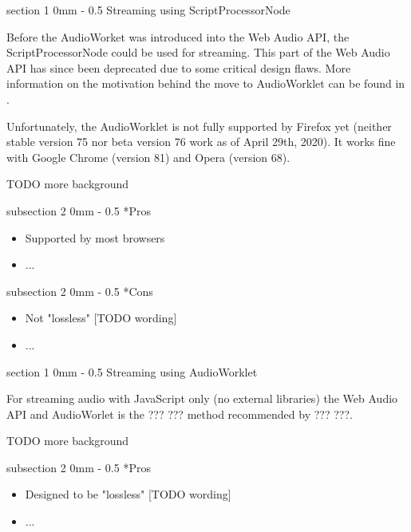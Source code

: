 \documentclass[11pt, a4paper, twoside]{article}
\makeatletter
\renewcommand{\subsection}{\@startsection
   {subsection}%
   {2}%
   {0mm}%
   {-\baselineskip}%
   {0.5\baselineskip}%
   {\bfseries\sffamily\large}}%
\renewcommand{\section}{\@startsection
   {section}%
   {1}%
   {0mm}%
   {-\baselineskip}%
   {0.5\baselineskip}%
   {\bfseries\sffamily\Large}}%
\makeatother
\begin{document}
\section{Streaming using ScriptProcessorNode}

Before the AudioWorket was introduced into the Web Audio API, the ScriptProcessorNode\cite{scriptprocessornode} could be used for streaming. This part of the Web Audio API has since been deprecated due to some critical design flaws. More information on the motivation behind the move to AudioWorklet can be found in \cite{icmc}.

Unfortunately, the AudioWorklet is not fully supported by Firefox yet (neither stable version 75 nor beta version 76 work as of April 29th, 2020). It works fine with Google Chrome (version 81) and Opera (version 68).

TODO more background

\subsection*{Pros}
\begin{itemize}
\item Supported by most browsers
\item ...
  \end{itemize}

\subsection*{Cons}
\begin{itemize}
\item Not "lossless" [TODO wording]
\item ...
\end{itemize}


\section{Streaming using AudioWorklet}

For streaming audio with JavaScript only (no external libraries) the Web Audio API and AudioWorlet\cite{audioworklet} is the ??? ??? method recommended by ??? ???.

TODO more background


\subsection*{Pros}
\begin{itemize}
\item Designed to be "lossless" [TODO wording]
\item ...
  \end{itemize}
\end{document}
